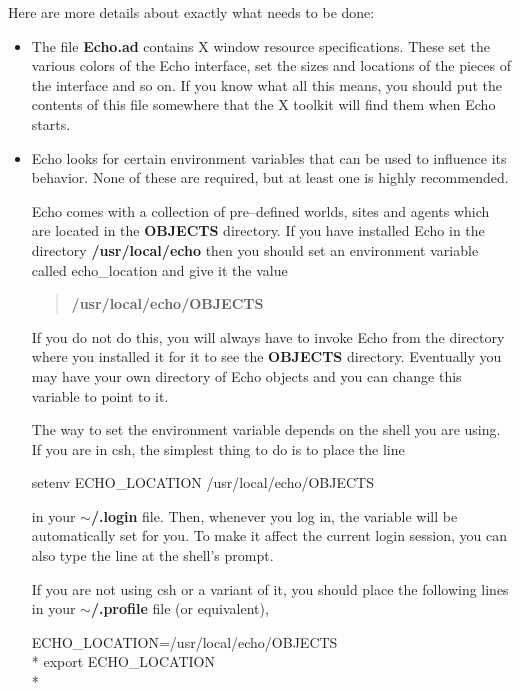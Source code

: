 Here are more details about exactly what needs to be done:

\begin{itemize}

\item
The file {\bf Echo.ad} contains X window  resource
 specifications.
These set the various colors of the Echo interface, set the sizes and
locations of the pieces of the interface and so on. If you know what
all this means, you should put the contents of this file somewhere
that the X toolkit will find them when Echo starts.

\item
Echo looks for certain environment variables  that can be used to influence its behavior. None of these
are required, but at least one is highly recommended.

Echo  comes with a collection of pre--defined
worlds, sites and agents which are located in the {\bf OBJECTS}
directory. If you have installed Echo in the directory {\bf
/usr/local/echo} then you should set an environment variable called
{\sc echo\_location} and give it the value

\begin{verse}
{\bf /usr/local/echo/OBJECTS}
\end{verse}

If you do not do this, you will always have to invoke Echo from the
directory where you installed it for it to see the {\bf OBJECTS}
directory. Eventually you may have your own directory of Echo objects
and you can change this variable to point to it.

The way to set the environment variable depends on the shell you are
using. If you are in csh, the simplest thing to do is to place the
line

\begin{shell}
setenv ECHO\_LOCATION /usr/local/echo/OBJECTS
\end{shell}

in your {\bf $\sim$/.login} file. Then, whenever you log in, the variable
will be automatically set for you. To make it affect the current login
session, you can also type the line at the shell's prompt.

If you are not using csh or a variant of it, you should place the
following lines in your {\bf $\sim$/.profile} file (or equivalent),

\begin{shell}
ECHO\_LOCATION=/usr/local/echo/OBJECTS \\*
export ECHO\_LOCATION \\*
\end{shell}


\end{itemize}
